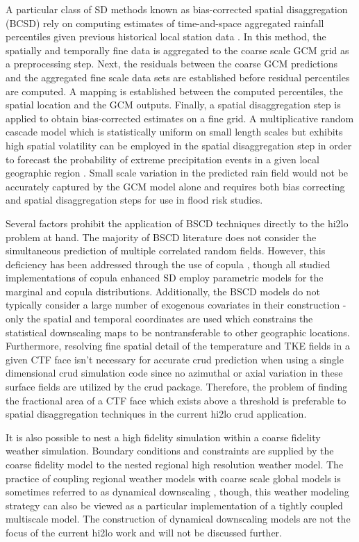 A particular class of SD methods known as bias-corrected spatial disaggregation (BCSD) rely on computing estimates of time-and-space aggregated rainfall percentiles given previous historical local station data \cite{wood2002}.  In this method, the spatially and temporally fine data is aggregated to the coarse scale GCM grid as a preprocessing step.  Next, the residuals between the coarse GCM predictions and the aggregated fine scale data sets are established before residual percentiles are computed.  A mapping is established between the computed percentiles, the spatial location and the GCM outputs.  Finally, a spatial disaggregation step is applied to obtain bias-corrected estimates on a fine grid.  A multiplicative random cascade model which is statistically uniform on small length scales but exhibits high spatial volatility can be employed in the spatial disaggregation step in order to forecast the probability of extreme precipitation events in a given local geographic region \cite{hess2007}.  Small scale variation in the predicted rain field would not be accurately captured by the GCM model alone and requires both bias correcting and spatial disaggregation steps for use in flood risk studies. 

Several factors prohibit the application of BSCD techniques directly to the hi2lo problem at hand.  The majority of BSCD literature does not consider the simultaneous prediction of multiple correlated random fields. However, this deficiency has been addressed through the use of copula \cite{alaya2014}, though all studied implementations of copula enhanced SD employ parametric models for the marginal and copula distributions.  Additionally, the BSCD models do not typically consider a large number of exogenous covariates in their construction - only the spatial and temporal coordinates are used which constrains the statistical downscaling maps to be nontransferable to other geographic locations.  Furthermore, resolving fine spatial detail of the temperature and TKE fields in a given CTF face isn't necessary for accurate crud prediction when using a single dimensional crud simulation code since no azimuthal or axial variation in these surface fields are utilized by the crud package.  Therefore, the problem of finding the fractional area of a CTF face which exists above a threshold is preferable to spatial disaggregation techniques in the current hi2lo crud application.

It is also possible to nest a high fidelity simulation within a coarse fidelity weather simulation. Boundary conditions and constraints are supplied by the coarse fidelity model to the nested regional high resolution weather model.  The practice of coupling regional weather models with coarse scale global models is sometimes referred to as dynamical downscaling \cite{Caldwell2009}, though, this weather modeling strategy can also be viewed as a particular implementation of a tightly coupled multiscale model.  The construction of dynamical downscaling models are not the focus of the current hi2lo work and will not be discussed further.

